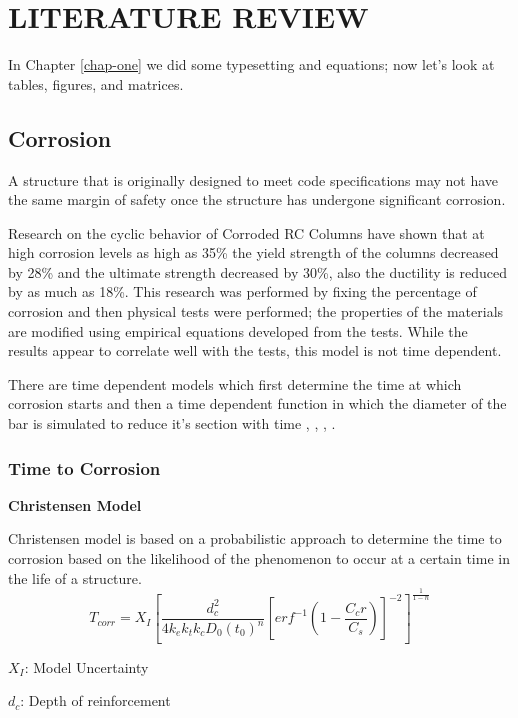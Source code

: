 \chapter{LITERATURE REVIEW}
\label{chap-two}
In Chapter \ref{chap-one} we did some typesetting and equations; now let's 
look at tables, figures, and matrices.

\section{Corrosion}

A structure that is originally designed to meet code specifications may not have the same margin of safety once the structure has undergone significant corrosion. 

Research on the cyclic behavior of Corroded RC Columns \cite{Yuan2017a} have shown that at high corrosion levels as high as 35\% the yield strength of the columns decreased by 28\% and the ultimate strength decreased by 30\%, also the ductility is reduced by as much as 18\%. This research was performed by fixing the percentage of corrosion and then physical tests were performed; the properties of the materials are modified using empirical equations developed from the tests. While the results appear to correlate well with the tests, this model is not time dependent.

There are time dependent models which first determine the time at which corrosion starts and then a time dependent function in which the diameter of the bar is simulated to reduce it’s section with time \cite{Y.Liu1998a}, \cite{Choe2008}, \cite{Thoft-Christensen}, \cite{Vu2000}.

\subsection{Time to Corrosion}

\textbf{Christensen Model}

Christensen model is based on a probabilistic approach to determine the time to corrosion based on the likelihood of the phenomenon to occur at a certain time in the life of a structure. 
\begin{equation}
  T_{corr}=X_I \left[\frac{d_c^2}{4k_e k_t k_c D_0 (t_0 )^n }\left[erf^{-1} \left(1-\frac{C_cr}{C_s} \right) \right]^{-2} \right]^{\frac{1}{1-n}}
  \label{eq:one}
\end{equation} 

$X_I$: Model Uncertainty

$d_c$: Depth of reinforcement

